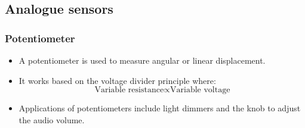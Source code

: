 \documentclass[11pt]{article}
\begin{document}
 \newpage

\subsection{Analogue sensors}
\label{sec:org09d2b87}

\subsubsection{Potentiometer}
\label{sec:org3143a9e}
\begin{itemize}
\item A potentiometer is used to measure angular or linear displacement.
\item It works based on the voltage divider principle where:
\[\text{Variable resistance} \propto \text{Variable voltage}\]
\item Applications of potentiometers include light dimmers and the knob to adjust the audio volume.
\end{itemize}
\end{document}
